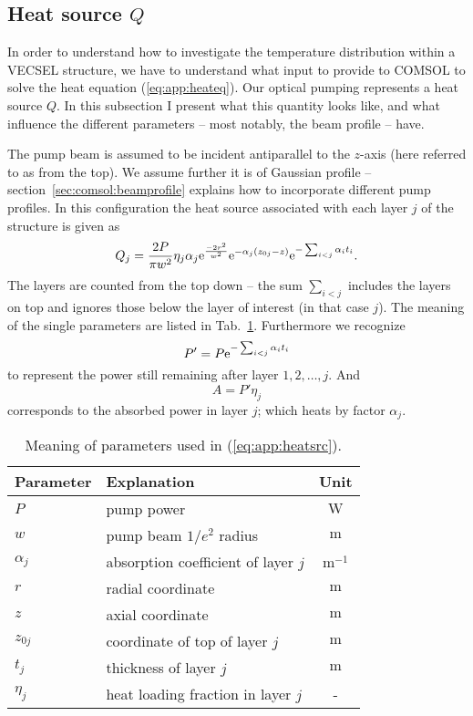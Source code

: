 \subsection{Heat source $Q$}
\label{app:comsol_deriv:Q}

In order to understand
how to investigate
the temperature distribution
within a VECSEL structure,
we have to understand
what input to provide to COMSOL
to solve the heat equation (\ref{eq:app:heateq}).
Our optical pumping represents
a heat source $Q$.
In this subsection
I present what this quantity looks like,
and what influence the different parameters --
most notably, the beam profile --
have.

The pump beam
is assumed to be
incident antiparallel to the $z$-axis
(here referred to as from the top).
We assume further
it is of Gaussian profile --
section~\ref{sec:comsol:beamprofile}
explains how to incorporate
different pump profiles.
In this configuration the heat source
associated with
each layer $j$ of the structure is given as
\cite{Kemp2008}
\begin{equation}
Q_j = \frac{2P}{\pi w^2} \eta_j\alpha_j \mathrm{e}^\frac{-2r^2}{w^2} \mathrm{e}^{-\alpha_j(z_{0j}-z)} \mathrm{e}^{-\sum_{i<j}\alpha_i t_i}.
\label{eq:app:heatsrc}
\end{equation}
The layers are counted from the top down --
the sum $\sum_{i<j}$ includes the layers on top
and ignores those below the layer of interest
(in that case $j$).
The meaning of the single parameters are listed in Tab.~\ref{tab:heatsrc}.
Furthermore we recognize
\begin{equation}
P'=P\mathrm{e}^{-\sum_{i<j}\alpha_i t_i}
\end{equation}
to represent the power still remaining after layer $1,2,\ldots,j$.
And
\begin{equation}
A=P'\eta_j
\end{equation}
corresponds
to the absorbed power in layer $j$;
which heats by factor $\alpha_j$.

\begin{table}[h]
\centering
\caption{Meaning of parameters used in (\ref{eq:app:heatsrc}).}
\begin{tabular}{llc}
\hline
Parameter & Explanation & Unit \\
\hline
$P$ & pump power & $\mathrm{W}$ \\
$w$ & pump beam $1/e^2$ radius & $\mathrm{m}$ \\
$\alpha_j$ & absorption coefficient of layer $j$ & $\mathrm{m}^{-1}$ \\
$r$ & radial coordinate & $\mathrm{m}$ \\
$z$ & axial coordinate & $\mathrm{m}$ \\
$z_{0j}$ & coordinate of top of layer $j$ & $\mathrm{m}$ \\
$t_j$ & thickness of layer $j$ & $\mathrm{m}$ \\
$\eta_j$ & heat loading fraction in layer $j$ & - \\
\hline
\end{tabular}
\label{tab:heatsrc}
\end{table}

